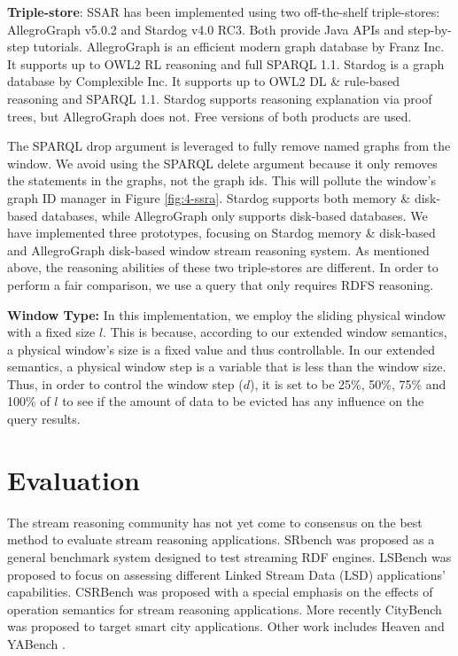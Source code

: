 \textbf{Triple-store}:
SSAR has been implemented using two off-the-shelf triple-stores: AllegroGraph v5.0.2 and Stardog v4.0 RC3. 
Both provide Java APIs and step-by-step tutorials. 
AllegroGraph is an efficient modern graph database by Franz Inc. 
It supports up to OWL2 RL reasoning and full SPARQL 1.1. 
Stardog is a graph database by Complexible Inc. 
It supports up to OWL2 DL \& rule-based reasoning and SPARQL 1.1.
Stardog supports reasoning explanation via proof trees, but AllegroGraph does not. 
Free versions of both products are used.

The SPARQL drop argument is leveraged to fully remove named graphs from the window. 
We avoid using the SPARQL delete argument because it only removes the statements in the graphs, not the graph ids.
This will pollute the window's graph ID manager in Figure \ref{fig:4-ssra}.
Stardog supports both memory \& disk-based databases, while AllegroGraph only supports disk-based databases. 
We have implemented three prototypes, focusing on Stardog memory \& disk-based and AllegroGraph disk-based window stream reasoning system. 
As mentioned above, the reasoning abilities of these two triple-stores are different.
In order to perform a fair comparison, we use a query that only requires RDFS reasoning.
%

\textbf{Window Type:}
In this implementation, we employ the sliding physical window with a fixed size $l$.
This is because, according to our extended window semantics, a physical window's size is a fixed value and thus controllable. 
In our extended semantics, a physical window step is a variable that is less than the window size. 
Thus, in order to control the window step ($d$), it is set to be 25\%, 50\%, 75\% and 100\% of $l$ to see if the amount of data to be evicted has any influence on the query results.
%
\section{Evaluation}
The stream reasoning community has not yet come to consensus on the best method to evaluate stream reasoning applications. 
SRbench\cite{zhang2012srbench} was proposed as a general benchmark system designed to test streaming RDF engines. 
LSBench\cite{le2012linked} was proposed to focus on assessing different Linked Stream Data (LSD) applications' capabilities. 
CSRBench\cite{dell2013correctness} was proposed with a special emphasis on the effects of operation semantics for stream reasoning applications. 
More recently CityBench\cite{ali2015citybench} was proposed to target smart city applications. 
Other work includes Heaven \cite{tommasini2015heaven} and YABench \cite{benchmarkdemo}.

